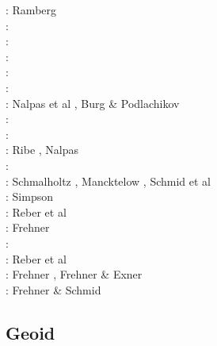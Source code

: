 \begin{scriptsize}
\nineteenseventy: Ramberg \cite{ramb70}\\
\nineteenseventyone: \cite{ramb71}\\
\nineteenninetyone: \cite{flet91}\\
\nineteenninetythree: \cite{zhhj93}\\
\nineteenninetyfive: \cite{flet95}\\
\nineteenninetysix: \cite{zhho96}\\
\nineteenninetynine: Nalpas et al \cite{nagg99}, Burg \& Podlachikov \cite{bupo99}\\
\twothousandone: \cite{scpo01}\\
\twothousandtwo: \cite{mumh02}\\
\twothousandthree: Ribe \cite{ribe03}, Nalpas \etal \cite{nagv03}\\
\twothousandsix: \cite{frsc06}\\
\twothousandeight: Schmalholtz \cite{schm08}, Mancktelow \cite{manc08}, Schmid et al \cite{scdk08}\\
\twothousandnine: Simpson \cite{simp09}\\
\twothousandten: Reber et al \cite{resb10}\\
\twothousandeleven: Frehner \cite{freh11}\\
\twothousandtwelve: \cite{reds12}\cite{grsc12}\cite{scsc12}\\
\twothousandthirteen: Reber et al \cite{regc13}\\
\twothousandfourteen: Frehner \cite{freh14}, Frehner \& Exner \cite{frex14}\\
\twothousandsixteen: Frehner \& Schmid \cite{frsc16}
\end{scriptsize}

\subsection{Geoid}

